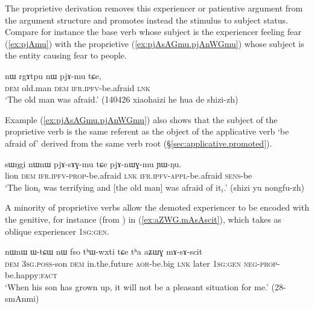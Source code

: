 The proprietive derivation removes this experiencer or patientive argument from the argument structure and promotes instead the stimulus to subject status. Compare for instance the base verb  whose subject is the experiencer feeling fear (\ref{ex:pjAmu}) with the proprietive  (\ref{ex:pjAsAGmu.pjAnWGmu}) whose subject is the entity causing fear to people. 


\begin{exe}
\ex \label{ex:pjAmu}
\gll nɯ rgɤtpu nɯ pjɤ-mu tɕe, \\
\textsc{dem} old.man \textsc{dem} \textsc{ifr}.\textsc{ipfv}-be.afraid \textsc{lnk} \\
\glt `The old man was afraid.' (140426 xiaohaizi he hua de shizi-zh)
\end{exe}


Example (\ref{ex:pjAsAGmu.pjAnWGmu}) also shows that the subject of the proprietive verb  is the same referent as the object of the applicative verb  `be afraid of' derived from the same verb root (§\ref{sec:applicative.promoted}).

\begin{exe}
\ex \label{ex:pjAsAGmu.pjAnWGmu}
\gll sɯŋgi nɯnɯ pjɤ-sɤɣ-mu tɕe pjɤ-nɯɣ-mu ɲɯ-ŋu.\\
lion \textsc{dem} \textsc{ifr}.\textsc{ipfv}-\textsc{prop}-be.afraid \textsc{lnk} \textsc{ifr}.\textsc{ipfv}-\textsc{appl}-be.afraid \textsc{sens}-be \\
\glt `The lion$_i$ was terrifying and [the old man] was afraid of it$_i$.' (shizi yu nongfu-zh)
\end{exe}

A minority of proprietive verbs allow the demoted experiencer to be encoded with the genitive, for instance  (from ) in (\ref{ex:aZWG.mAsAscit}), which takes as oblique experiencer  \textsc{1sg}:\textsc{gen}.

\largerpage
\begin{exe}
\ex \label{ex:aZWG.mAsAscit}
\gll  nɯnɯ ɯ-tɕɯ nɯ fso tʰɯ-wxti tɕe tʰa aʑɯɣ mɤ-sɤ-scit \\
\textsc{dem} \textsc{3sg}.\textsc{poss}-son \textsc{dem} in.the.future \textsc{aor}-be.big \textsc{lnk} later \textsc{1sg}:\textsc{gen} \textsc{neg}-\textsc{prop}-be.happy:\textsc{fact} \\
\glt `When his son has grown up, it will not be a pleasant situation for me.' (28-smAnmi)
\end{exe}
 

